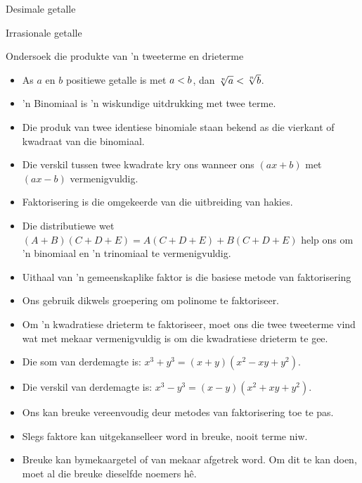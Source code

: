 \begin{Aktiwiteit}{Desimale getalle}
\begin{aktiwiteit}{Irrasionale getalle}
\begin{aktiwiteit}{Ondersoek die produkte van 'n tweeterme en drieterme}
\begin{itemize}[itemsep=5pt, label=\textbullet{}]
\item As $a$ en $b$ positiewe getalle is met $a<{}b$, dan $\sqrt[n]{a}<{}\sqrt[n]{b}$.
\item ’n Binomiaal is ’n wiskundige uitdrukking met twee terme.
\item Die produk van twee identiese binomiale staan bekend as die vierkant of kwadraat van die binomiaal. 
\item Die verskil tussen twee kwadrate kry ons wanneer ons $(ax+b)$ met $(ax-b)$ vermenigvuldig.
\item Faktorisering is die omgekeerde van die uitbreiding van hakies.
\item Die distributiewe wet $(A+B)(C+D+E)=A(C+D+E)+B(C+D+E)$ help ons om ’n binomiaal en ’n trinomiaal te vermenigvuldig.
\item Uithaal van 'n gemeenskaplike faktor is die basiese metode van faktorisering
\item Ons gebruik dikwels groepering om polinome te faktoriseer.
\item Om ’n kwadratiese drieterm te faktoriseer, moet ons die twee tweeterme vind wat met mekaar vermenigvuldig is om die kwadratiese drieterm te gee.
\item Die som van derdemagte is: ${x}^{3}+{y}^{3}=(x+y)({x}^{2}-xy+{y}^{2})$. 
\item Die verskil van derdemagte is: ${x}^{3}-{y}^{3}=(x-y)({x}^{2}+xy+{y}^{2})$.
\item Ons kan breuke vereenvoudig deur metodes van faktorisering toe te pas.
\item Slegs faktore kan uitgekanselleer word in breuke, nooit terme niw.
\item Breuke kan bymekaargetel of van mekaar afgetrek word. Om dit te kan doen, moet al die breuke dieselfde
noemers hê.

\end{itemize}


\begin{eocexercises}{}



\end{eocexercises}
\end{aktiwiteit}
\end{aktiwiteit}
\end{Aktiwiteit}
